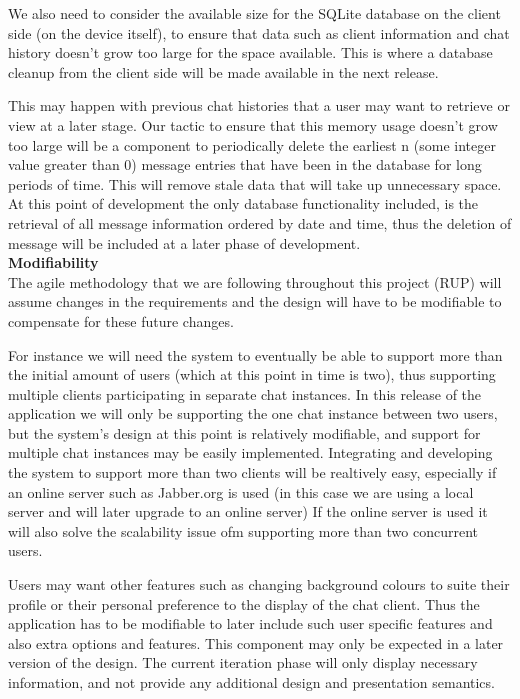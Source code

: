 \documentclass[29pt,a4paper]{moderncv}
\begin{document}
				We also need to consider the available size for the SQLite database on the client side (on the device itself), to ensure that data such as client information and chat history doesn’t grow too large for the space available. This is where a database cleanup from the client side will be made available in the next release.
				
				This may happen with previous chat histories that a user may want to retrieve or view at a later stage. Our tactic to ensure that this memory usage doesn’t grow too large will be a component to periodically delete the earliest n (some integer value greater than 0) message entries that have been in the database for long periods of time. This will remove stale data that will take up unnecessary space.  At this point of development the only database functionality included, is the retrieval of all message information ordered by date and time, thus the deletion of message will be included at a later phase of development.\\
			
			\noindent\textbf{Modifiability}\\
			The agile methodology that we are following throughout this project (RUP) will assume changes in the requirements and the design will have to be modifiable to compensate for these future changes.
			
			For instance we will need the system to eventually be able to support more than the initial amount of users (which at this point in time is two), thus supporting multiple clients participating in separate chat instances.  In this release of the application we will only be supporting the one chat instance between two users, but the system’s design at this point is relatively modifiable, and support for multiple chat instances may be easily implemented. Integrating and developing the system to support more than two clients will be realtively easy, especially if an online server such as Jabber.org is used (in this case we are using a local server and will later upgrade to an online server) If the online server is used it will also solve the scalability issue ofm supporting more than two concurrent users.
			
			Users may want other features such as changing background colours to suite their profile or their personal preference to the display of the chat client. Thus the application has to be modifiable to later include such user specific features and also extra options and features.  This component may only be expected in a later version of the design.  The current iteration phase will only display necessary information, and not provide any additional design and presentation semantics.
			\\  			
			
\end{document}
